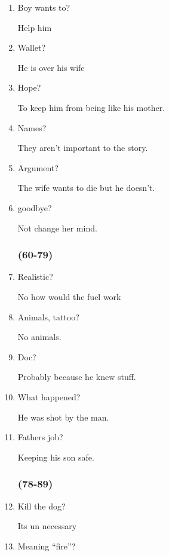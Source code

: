 \begin{multicols}{3}
\begin{enumerate}
    \item Boy wants to?

    Help him

    \item Wallet?

    He is over his wife

    \item Hope?

    To keep him from being like his mother.

    \item Names?

    They aren’t important to the story.

    \item Argument?

    The wife wants to die but he doesn’t.

    \item goodbye?

    Not change her mind.

    \subsubsection{(60-79)}

    \item Realistic?

    No how would the fuel work

    \item Animals, tattoo?

    No animals.

    \item Doc?

    Probably because he knew stuff.

    \item What happened?

    He was shot by the man.

    \item Fathers job?

    Keeping his son safe.

    \subsubsection{(78-89)}

    \item Kill the dog?

    Its un necessary

    \item Meaning “fire”?


\end{enumerate}
\end{multicols}
